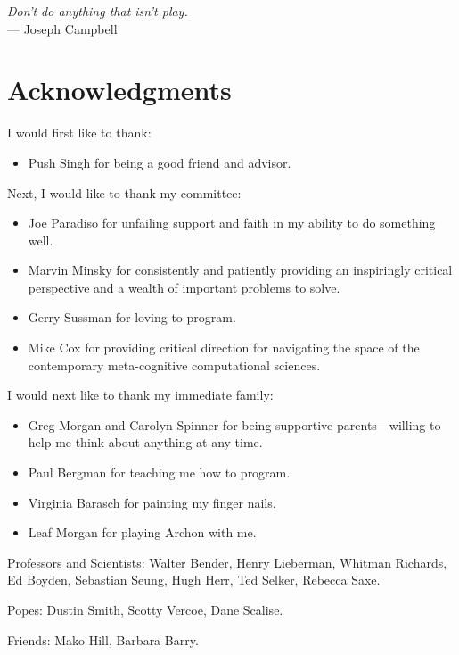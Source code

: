 



\begin{flushright}{\slshape    
Don't do anything that isn't play.} \\ \medskip
    --- Joseph Campbell
\end{flushright}



\bigskip

\begingroup
\let\clearpage\relax
\let\cleardoublepage\relax
\let\cleardoublepage\relax
\chapter*{Acknowledgments}

I would first like to thank:

\begin{itemize}
\item{Push Singh for being a good friend and advisor.}
\end{itemize}

Next, I would like to thank my committee:

\begin{itemize}
\item{Joe Paradiso for unfailing support and faith in my ability to do
  something well.}
\item{Marvin Minsky for consistently and patiently providing an
  inspiringly critical perspective and a wealth of important problems
  to solve.}
\item{Gerry Sussman for loving to program.}
\item{Mike Cox for providing critical direction for navigating the
  space of the contemporary meta-cognitive computational sciences.}
\end{itemize}

I would next like to thank my immediate family:

\begin{itemize}
\item{Greg Morgan and Carolyn Spinner for being supportive parents---willing to help me think about anything at any time.}
\item{Paul Bergman for teaching me how to program.}
\item{Virginia Barasch for painting my finger nails.}
\item{Leaf Morgan for playing Archon with me.}
\end{itemize}

Professors and Scientists: Walter Bender, Henry Lieberman, Whitman
Richards, Ed Boyden, Sebastian Seung, Hugh Herr, Ted Selker, Rebecca
Saxe.

Popes: Dustin Smith, Scotty Vercoe, Dane Scalise.

Friends: Mako Hill, Barbara Barry.

\endgroup

